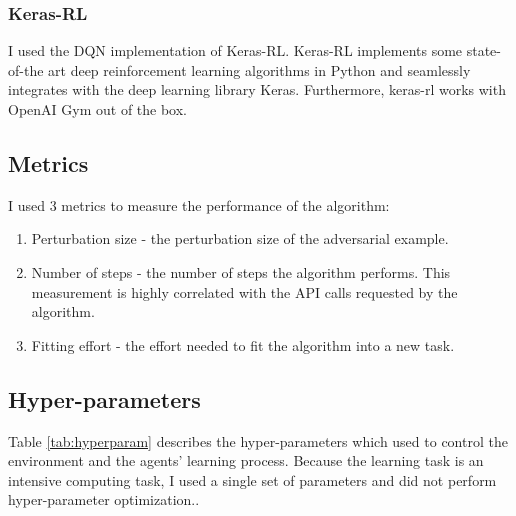 \documentclass{article}
\begin{document}
\subsubsection{Keras-RL}
I used the DQN implementation of Keras-RL. Keras-RL \cite{plappert2016kerasrl} implements some state-of-the art deep reinforcement learning algorithms in Python and seamlessly integrates with the deep learning library Keras. Furthermore, keras-rl works with OpenAI Gym out of the box. 

\subsection{Metrics}
I used 3 metrics to measure the performance of the algorithm: 

\begin{enumerate}
\item Perturbation size - the perturbation size of the adversarial example. 
\item Number of steps - the number of steps the algorithm performs. This measurement is highly correlated with the API calls requested by the algorithm. 
\item Fitting effort - the effort needed to fit the algorithm into a new task.
\end{enumerate}

\subsection{Hyper-parameters}
Table \ref{tab:hyperparam} describes the hyper-parameters which used to control the environment and the agents' learning process.
Because the learning task is an intensive computing task, I used a single set of parameters and did not perform hyper-parameter optimization..
\end{document}
